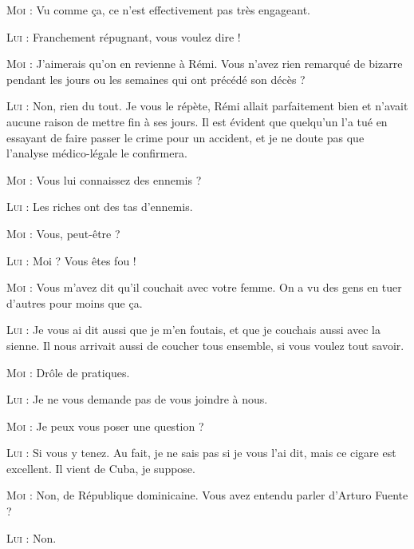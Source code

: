 \begin{dialogue}
\textsc{Moi} : Vu comme ça, ce n’est effectivement pas très engageant.

\textsc{Lui} : Franchement répugnant, vous voulez dire !

\textsc{Moi} : J’aimerais qu’on en revienne à Rémi. Vous n’avez rien remarqué de bizarre pendant les jours ou les semaines qui ont précédé son décès ?

\textsc{Lui} : Non, rien du tout. Je vous le répète, Rémi allait parfaitement bien et n’avait aucune raison de mettre fin à ses jours. Il est évident que quelqu’un l’a tué en essayant de faire passer le crime pour un accident, et je ne doute pas que l’analyse médico-légale le confirmera.

\textsc{Moi} : Vous lui connaissez des ennemis ?

\textsc{Lui} : Les riches ont des tas d’ennemis.

\textsc{Moi} : Vous, peut-être ?

\textsc{Lui} : Moi ? Vous êtes fou !

\textsc{Moi} : Vous m’avez dit qu’il couchait avec votre femme. On a vu des gens en tuer d’autres pour moins que ça.

\textsc{Lui} : Je vous ai dit aussi que je m’en foutais, et que je couchais aussi avec la sienne. Il nous arrivait aussi de coucher tous ensemble, si vous voulez tout savoir.

\textsc{Moi} : Drôle de pratiques.

\textsc{Lui} : Je ne vous demande pas de vous joindre à nous.

\textsc{Moi} : Je peux vous poser une question ?

\textsc{Lui} : Si vous y tenez. Au fait, je ne sais pas si je vous l’ai dit, mais ce cigare est excellent. Il vient de Cuba, je suppose.

\textsc{Moi} : Non, de République dominicaine. Vous avez entendu parler d’Arturo Fuente ?

\textsc{Lui} : Non.


\end{dialogue}
